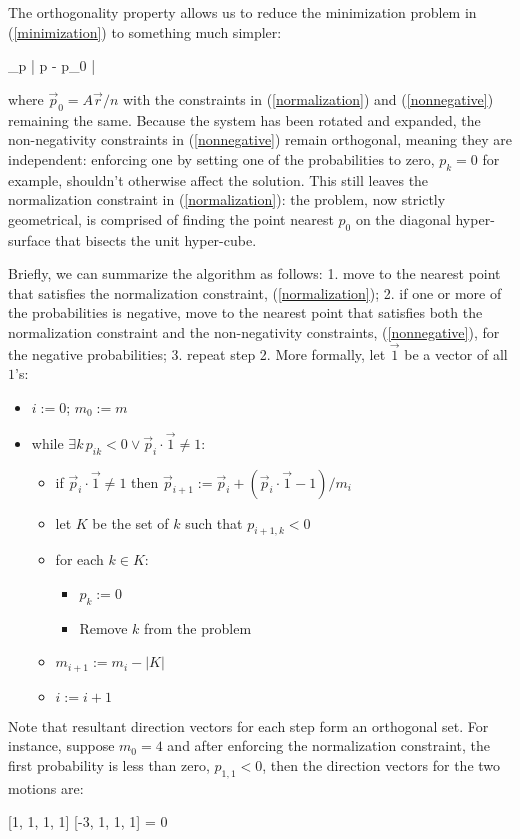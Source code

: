 The orthogonality property allows us to reduce the minimization problem 
in (\ref{minimization}) to something much simpler:
\begin{eqnnon}
	\arg \min_{\vec p} | \vec p - \vec p_0 |
\end{eqnnon}
where $\vec p_0 = A \vec r/n$ with the constraints in (\ref{normalization}) and
(\ref{nonnegative}) remaining the same.
Because the system has been rotated and expanded, the non-negativity 
constraints in (\ref{nonnegative}) remain orthogonal, meaning they are 
independent: enforcing one by setting one of the probabilities to zero, 
$p_k=0$ for example, shouldn't otherwise affect the solution.
This still leaves the normalization constraint in (\ref{normalization}):
the problem, now strictly geometrical, is comprised of finding the point nearest $p_0$ on the diagonal hyper-surface that bisects the unit hyper-cube.

Briefly, we can summarize the algorithm as follows:
1. move to the nearest point that satisfies the normalization constraint,
(\ref{normalization}); 2. if one or more of the probabilities is negative,
move to the nearest point that satisfies both 
the normalization constraint
and the non-negativity constraints, (\ref{nonnegative}), for the negative probabilities;
3. repeat step 2.
More formally, let $\vec 1$ be a vector of all $1$'s:
\begin{itemize}
	\item $i:=0$; $m_0:=m$
	\item while $\exists k \, p_{ik} < 0 \lor \vec p_i \cdot \vec 1 \ne 1$:
	\begin{itemize}
		\item if $\vec p_i \cdot \vec 1 \ne 1$ then 
		$\vec p_{i+1} := \vec p_i + (\vec p_i \cdot \vec 1 - 1)/m_i$
		\item let $K$ be the set of $k$ such that $p_{i+1,k} < 0$
		\item for each $k \in K$:
		\begin{itemize}
			\item $p_k:=0$
			\item Remove $k$ from the problem
		\end{itemize}
		\item $m_{i+1}:=m_i-|K|$
		\item $i:=i+1$
	\end{itemize}
\end{itemize}

%

Note that resultant direction vectors for each step form an orthogonal set.
For instance, suppose $m_0=4$ and after enforcing the normalization constraint,
the first probability is less than zero, $p_{1,1} < 0$,
then the direction vectors for the two motions are:
\begin{eqnnon}
	[1, 1, 1, 1] \cdot {} [-3, 1, 1, 1] = 0
\end{eqnnon}

